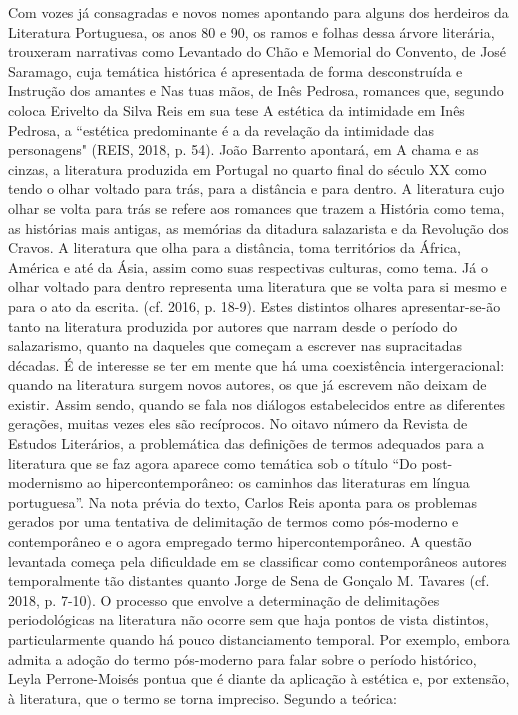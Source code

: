 \documentclass[../DISSERTACAO_MAIN.tex]{subfiles}
\begin{document}
Com vozes já consagradas e novos nomes apontando para alguns dos herdeiros da Literatura Portuguesa, os anos 80 e 90, os ramos e folhas dessa árvore literária, trouxeram narrativas como Levantado do Chão e Memorial do Convento, de José Saramago, cuja temática histórica é apresentada de forma desconstruída e Instrução dos amantes e Nas tuas mãos, de Inês Pedrosa, romances que, segundo coloca Erivelto da Silva Reis em sua tese A estética da intimidade em Inês Pedrosa, a “estética predominante é a da revelação da intimidade das personagens" (REIS, 2018, p. 54). João Barrento apontará, em A chama e as cinzas, a literatura produzida em Portugal no quarto final do século XX como tendo o olhar voltado para trás, para a distância e para dentro. A literatura cujo olhar se volta para trás se refere aos romances que trazem a História como tema, as histórias mais antigas, as memórias da ditadura salazarista e da Revolução dos Cravos. A literatura que olha para a distância, toma territórios da África, América e até da Ásia, assim como suas respectivas culturas, como tema. Já o olhar voltado para dentro representa uma literatura que se volta para si mesmo e para o ato da escrita. (cf. 2016, p. 18-9). Estes distintos olhares apresentar-se-ão tanto na literatura produzida por autores que narram desde o período do salazarismo, quanto na daqueles que começam a escrever nas supracitadas décadas. É de interesse se ter em mente que há uma coexistência intergeracional: quando na literatura surgem novos autores, os que já escrevem não deixam de existir. Assim sendo, quando se fala nos diálogos estabelecidos entre as diferentes gerações, muitas vezes eles são recíprocos.
No oitavo número da Revista de Estudos Literários, a problemática das definições de termos adequados para a literatura que se faz agora aparece como temática sob o título “Do post-modernismo ao hipercontemporâneo: os caminhos das literaturas em língua portuguesa”. Na nota prévia do texto, Carlos Reis aponta para os problemas gerados por uma tentativa de delimitação de termos como pós-moderno e contemporâneo e o agora empregado termo hipercontemporâneo. A questão levantada começa pela dificuldade em se classificar como contemporâneos autores temporalmente tão distantes quanto Jorge de Sena de Gonçalo M. Tavares (cf. 2018, p. 7-10).
O processo que envolve a determinação de delimitações periodológicas na literatura não ocorre sem que haja pontos de vista distintos, particularmente quando há pouco distanciamento temporal.  Por exemplo, embora admita a adoção do termo pós-moderno para falar sobre o período histórico, Leyla Perrone-Moisés pontua que é diante da aplicação à estética e, por extensão, à literatura, que o termo se torna impreciso. Segundo a teórica:
\end{document}
